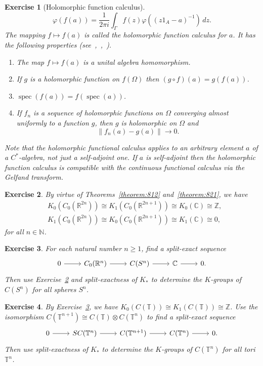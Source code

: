 \documentclass{book}
\newtheorem{exercise}{Exercise}[section]
\def\cstar{\(C^*\)-algebra}
\begin{document}
\begin{exercise}[Holomorphic function calculus]
  \[
    \varphi(f(a))=\frac{1}{2\pi i}\int_\Gamma f(z)\varphi({(z1_A-a)}^{-1})\,dz.
  \]
  The mapping \(f\mapsto f(a)\) is called the \textit{holomorphic function calculus} for \(a\).
  It has the following properties (see\ \cite{TM79},\ \cite{MGJ90},\ \cite{PGK79}).
  \begin{enumerate}
    \item The map \(f\mapsto f(a)\) is a unital algebra homomorphism.
    \item If \(g\) is a holomorphic function on \(f(\Omega)\) then \((g\circ f)(a)=g(f(a))\).
    \item \(\operatorname{spec}(f(a))=f(\operatorname{spec}(a))\).
    \item If \(f_n\) is a sequence of holomorphic functions on \(\Omega\) converging almost uniformly to a function \(g\), then \(g\) is holomorphic on \(\Omega\) and
    \[
      \|f_n(a)-g(a)\|\rightarrow 0.
    \]
  \end{enumerate}
  Note that the holomorphic functional calculus applies to an arbitrary element \(a\) of a \cstar, not just a self-adjoint one. If \(a\) is self-adjoint then the holomorphic function calculus is compatible
  with the continuous functional calculus via the Gelfand transform.
\end{exercise}
\begin{exercise}\label{ex:844}
  By virtue of Theorems~\ref{theorem:812} and~\ref{theorem:821}, we have
  \begin{align*}
    &K_0(C_0(\mathbb{R}^{2n}))\cong K_1(C_0(\mathbb{R}^{2n+1}))\cong K_0(\mathbb{C})\cong\mathbb{Z},\\
    &K_1(C_0(\mathbb{R}^{2n}))\cong K_0(C_0(\mathbb{R}^{2n+1}))\cong K_1(\mathbb{C})\cong 0,
  \end{align*}
  for all \(n\in\mathbb{N}\).
\end{exercise}
\begin{exercise}\label{ex:845}
  For each natural number \(n\geq 1\), find a split-exact sequence
  \[
    \begin{tikzcd}
      0\arrow[r]&C_0(\mathbb{R}^n)\arrow[r]&C(S^n)\arrow[r]&\mathbb{C}\arrow[r]&0.
    \end{tikzcd}
  \]
  Then use Exercise~\ref{ex:844} and split-exactness of \(K_*\) to determine the \(K\)-groups of \(C(S^n)\) for all spheres \(S^n\).
\end{exercise}
\begin{exercise}\label{ex:846}
  By Exercise~\ref{ex:845}, we have \(K_0(C(\mathbb{T}))\cong K_1(C(\mathbb{T}))\cong\mathbb{Z}\).
  Use the isomorphism \(C(\mathbb{T}^{n+1})\cong C(\mathbb{T})\otimes C(\mathbb{T}^n)\) to find a split-exact sequence
  \[
    \begin{tikzcd}
      0\arrow[r]&S C(\mathbb{T}^n)\arrow[r]&C(\mathbb{T}^{n+1})\arrow[r]&C(\mathbb{T}^n)\arrow[r]&0.
    \end{tikzcd}
  \]
  Then use split-exactness of \(K_*\) to determine the \(K\)-groups of \(C(\mathbb{T}^n)\) for all tori \(\mathbb{T}^n\).
\end{exercise}
\end{document}

